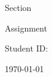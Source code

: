 \ifx\HWTITLEDEF\undefined

\newcommand{\HWTITLEDEF}{}

\ifx\CROWDMARK\undefined

\ifx\assignmentkeyword\undefined
\newcommand{\assignmentkeyword}{Assignment}
\fi

\ifx\assignmenttitle\undefined
\newcommand{\assignmenttitle}{\assignmentkeyword \ \assignmentnum}
\fi



\begin{titlepage}
\centering

\vspace*{3cm}

\ifx\hwtitlelarge\undefined
\newcommand{\hwtitlelarge}{
\coursename

\ifdefined\coursesec
Section \coursesec
\fi

\vspace{2cm}
\assignmenttitle
}
\fi

{\Large 
\hwtitlelarge
}

\vspace{2cm}
        
\studentname

\ifdefined\studentid
Student ID: \studentid
\fi

\ifdefined\studentemail
\texttt{\studentemail}
\fi
\vspace{3cm}

\today

\end{titlepage}

\let\hwtitlelarge\undefined
\let\assignmentkeyword\undefined
   
\fi
\fi